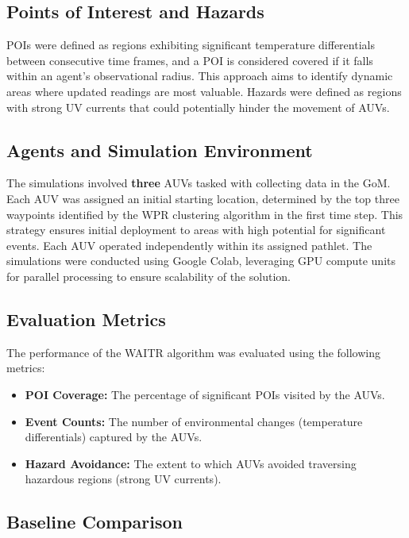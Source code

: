\documentclass[conference]{IEEEtran}
\begin{document}
\subsection{Points of Interest and Hazards}

POIs were defined as regions exhibiting significant temperature differentials between consecutive time frames, and a POI is considered covered if it falls within an agent's observational radius. This approach aims to identify dynamic areas where updated readings are most valuable. Hazards were defined as regions with strong UV currents that could potentially hinder the movement of AUVs. 

\subsection{Agents and Simulation Environment}

The simulations involved \textbf{three} AUVs tasked with collecting data in the GoM. Each AUV was assigned an initial starting location, determined by the top three waypoints identified by the WPR clustering algorithm in the first time step. This strategy ensures initial deployment to areas with high potential for significant events. Each AUV operated independently within its assigned pathlet. The simulations were conducted using Google Colab, leveraging GPU compute units for parallel processing to ensure scalability of the solution. 

\subsection{Evaluation Metrics}

The performance of the WAITR algorithm was evaluated using the following metrics:

\begin{itemize}
\item \textbf{POI Coverage:} The percentage of significant POIs visited by the AUVs.
\item \textbf{Event Counts:} The number of environmental changes (temperature differentials) captured by the AUVs. 
\item \textbf{Hazard Avoidance:} The extent to which AUVs avoided traversing hazardous regions (strong UV currents). 
\end{itemize}

\subsection{Baseline Comparison}
\end{document}

